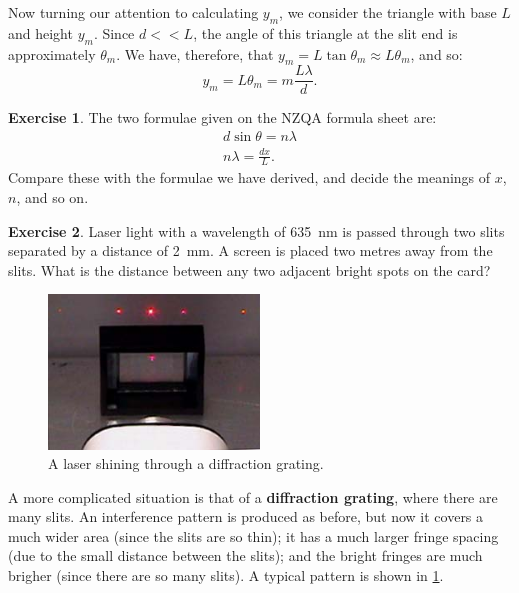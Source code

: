 \documentclass[a4paper]{amsbook}
\theoremstyle{definition}
\newtheorem{exercise}{Exercise}
\numberwithin{exercise}{chapter}
\numberwithin{exercise}{chapter}
\begin{document}
Now turning our attention to calculating $ y_m $, we consider the triangle with base $ L $ and height $ y_m $. Since $ d << L $, the angle of this
triangle at the slit end is approximately $ \theta_m $. We have, therefore, that $ y_m = L\tan \theta_m \approx L \theta_m $, and so:
\begin{equation}
  y_m = L \theta_m = m\frac{L\lambda}{d}.
\end{equation}

\begin{exercise}
  The two formulae given on the NZQA formula sheet are:
  \begin{gather*}
    d \sin \theta = n \lambda\\
    n\lambda = \frac{dx}{L}.
  \end{gather*}
  Compare these with the formulae we have derived, and decide the meanings of $ x $, $ n $, and so on.
\end{exercise}

\begin{exercise}
  Laser light with a wavelength of \SI{635}{\nano\metre} is passed through two slits separated by a distance of \SI{2}{\milli\metre}.
  A screen is placed two metres away from the slits. What is the distance between any two adjacent bright spots on the card?
\end{exercise}

\begin{figure}
  \centering
  \includegraphics[width=0.5\textwidth]{diffgrating}
  \caption{A laser shining through a diffraction grating.}\label{fig:diffgrating}
\end{figure}
A more complicated situation is that of a \textbf{diffraction grating}, where there are many slits. An interference pattern is produced as
before, but now it covers a much wider area (since the slits are so thin); it has a much larger fringe spacing (due to the small distance
between the slits); and the bright fringes are much brigher (since there are so many slits). A typical pattern is shown in \cref{fig:diffgrating}.
\end{document}
